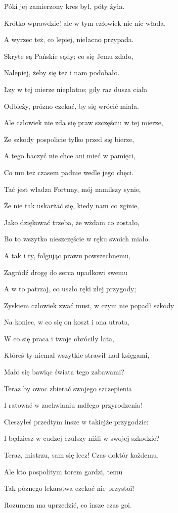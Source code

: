 \documentclass{article}
\begin{document}
Póki jej zamierzony kres był, póty żyła.

Krótko wprawdzie! ale w tym człowiek nic nie włada,

A wyrzec też, co lepiej, niełacno przypada.

Skryte są Pańskie sądy; co się Jemu zdało,

Nalepiej, żeby się też i nam podobało.

Łzy w tej mierze niepłatne; gdy raz dusza ciała

Odbieży, prózno czekać, by się wrócić miała.

Ale człowiek nie zda się praw szczęściu w tej mierze,

Że szkody pospolicie tylko przed się bierze,

A tego baczyć nie chce ani mieć w pamięci,

Co mu też czasem padnie wedle jego chęci.

Tać jest władza Fortuny, mój namilszy synie,

Że nie tak uskarżać się, kiedy nam co zginie,

Jako dziękować trzeba, że wżdam co zostało,

Bo to wszytko nieszczęście w ręku swoich miało.

A tak i ty, folgując prawu powszechnemu,

Zagródź drogę do serca upadkowi swemu

A w to patrzaj, co uszło ręki złej przygody;

Zyskiem człowiek zwać musi, w czym nie popadł szkody

Na koniec, w co się on koszt i ona utrata,

W co się praca i twoje obróciły lata,

Któreś ty niemal wszytkie strawił nad księgami,

Mało się bawiąc świata tego zabawami?

Teraz by owoc zbierać swojego szczepienia

I ratować w zachwianiu mdłego przyrodzenia!

Cieszyłeś przedtym insze w takiejże przygodzie:

I będziesz w cudzej czulszy niżli w swojej szkodzie?

Teraz, mistrzu, sam się lecz! Czas doktór każdemu,

Ale kto pospolitym torem gardzi, temu

Tak póznego lekarstwa czekać nie przystoi!

Rozumem ma uprzedzić, co insze czas goi.
\end{document}
